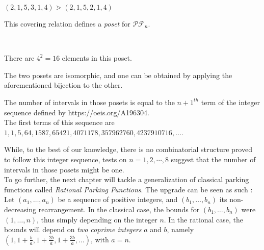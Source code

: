 \begin{example}[$n = 6$]
    $(2, 1, 5, 3, 1, 4) \gtrdot (2, 1, 5, 2, 1, 4)$    
\end{example}

\begin{prop}
    This covering relation defines a \emph{poset}
    for $\mathcal{PF}_n$.
\end{prop}

\begin{example}
    ~\\
    \begin{center}
        
        There are $4^2 = 16$ elements in this poset.
    \end{center}
\end{example}

\begin{rem}
    The two posets are isomorphic, and one can be obtained by
    applying the aforementioned bijection to the other.
\end{rem}

\begin{conj}
    The number of intervals in those posets is equal to
    the $n+1^{th}$ term of the integer sequence defined by
    https://oeis.org/A196304.\\
    The first terms of this sequence are $1, 1, 5, 64, 1587,
    65421, 4071178, 357962760, 4237910716, ...$.
\end{conj}

While, to the best of our knowledge, there is no combinatorial
structure proved to follow this integer sequence, tests on
$n = 1, 2, \cdots, 8$ suggest that the number of intervals in
those posets might be one.\\

To go further, the next chapter will tackle a generalization
of classical parking functions called \emph{Rational Parking
Functions}.
The upgrade can be seen as such :
Let $(a_1, \ldots, a_n)$ be a sequence of positive integers,
and $(b_1, \ldots, b_n)$ its non-decreasing rearrangement.
In the classical case, the bounds for $(b_1, \ldots, b_n)$
were $(1, \ldots, n)$, thus simply depending on the integer $n$.
In the rational case, the bounds will depend on \emph{two
coprime integers} $a$ and $b$, namely $(1, 1 + \frac{b}{a},
1 + \frac{2b}{a}, 1 + \frac{3b}{a}, \ldots)$, with $a = n$. 